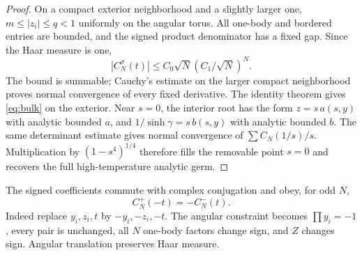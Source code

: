 \documentclass[11pt]{article}
\numberwithin{equation}{section}
\theoremstyle{remark}\newtheorem{remark}[theorem]{Remark}
\begin{document}
\begin{proof}
On a compact exterior neighborhood and a slightly larger one,
$m\le|z_i|\le q<1$ uniformly on the angular torus.
All one-body and bordered entries are bounded, and the signed
product denominator has a fixed gap. Since the Haar measure is one,
\[
 |C_N^\sigma(t)|\le C_0\sqrt N(C_1/\sqrt N)^N.
\]
The bound is summable; Cauchy's estimate on the larger compact
neighborhood proves normal convergence of every fixed derivative.
The identity theorem gives \eqref{eq:bulk} on the exterior.
Near $s=0$, the interior root has the form $z=s\,a(s,y)$ with
analytic bounded $a$, and $1/\sinh\gamma=s\,b(s,y)$ with
analytic bounded $b$. The same determinant estimate gives normal
convergence of $\sum C_N(1/s)/s$. Multiplication by
$(1-s^4)^{1/4}$ therefore fills the removable point $s=0$ and
recovers the full high-temperature analytic germ.
\end{proof}

The signed coefficients commute with complex conjugation and obey,
for odd $N$,
\begin{equation}\label{eq:negation}
 C_N^+(-t)=-C_N^-(t).
\end{equation}
Indeed replace $y_i,z_i,t$ by $-y_i,-z_i,-t$.
The angular constraint becomes $\prod y_i=-1$, every pair is
unchanged, all $N$ one-body factors change sign, and $Z$ changes
sign. Angular translation preserves Haar measure.
\end{document}
